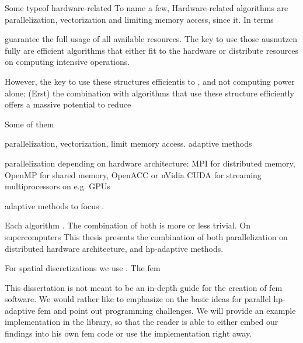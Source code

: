 Some typeof hardware-related 
To name a few, Hardware-related algorithms are parallelization, vectorization and limiting memory access, since it. In terms 


guarantee the full usage of all available resources. The key to use those ausnutzen fully are efficient algorithms that either fit to the hardware or distribute resources on computing intensive operations.

However, the key to use these structures efficientis to , and not computing power alone; (Erst) the combination with algorithms that use these structure efficiently offers a massive potential to reduce 




Some of them

parallelization, vectorization, limit memory access. adaptive methods

parallelization depending on hardware architecture: MPI for distributed memory, OpenMP for shared memory, OpenACC or nVidia CUDA for streaming multiprocessors on e.g. GPUs

adaptive methods to focus .


Each algorithm . The combination of both is more or less trivial.
On supercomputers
This thesis presents the combination of both parallelization on distributed hardware architecture, and hp-adaptive methods.

For spatial discretizations we use . The \gls{fem}


This dissertation is not meant to be an in-depth guide for the creation of \gls{fem} software. We would rather like to emphasize on the basic ideas for parallel hp-adaptive \gls{fem} and point out programming challenges. We will provide an example implementation in the \dealii{} library, so that the reader is able to either embed our findings into his own \gls{fem} code or use the \dealii{} implementation right away.